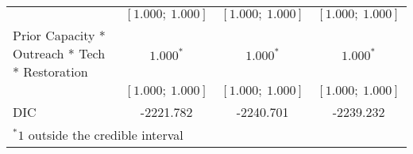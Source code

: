 \begin{table}
\begin{center}
\begin{tabular}{l c c c }
                                               & $[1.000;\ 1.000]$ & $[1.000;\ 1.000]$ & $[1.000;\ 1.000]$ \\
Prior Capacity * Outreach * Tech * Restoration & $1.000^{*}$       & $1.000^{*}$       & $1.000^{*}$       \\
                                               & $[1.000;\ 1.000]$ & $[1.000;\ 1.000]$ & $[1.000;\ 1.000]$ \\
\hline
DIC                                            & -2221.782         & -2240.701         & -2239.232         \\
\hline
\multicolumn{4}{l}{\scriptsize{$^* 1$ outside the credible interval}}
\end{tabular}
\label{table:capacityfunding}
\end{center}
\end{table}
